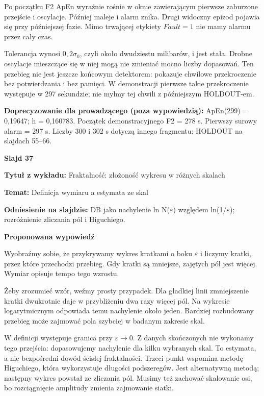 \documentclass[a4paper,11pt]{article}
\newcommand{\NumerSlajdu}{1}
\newcommand{\Komentarz}[3]{%
  \gdef\NumerSlajdu{#1}%
  {\Large\bfseries Slajd #1\par}\smallskip
  \textbf{Tytuł z wykładu:} #2\par
  \textbf{Temat:} #3\par\medskip
}
\begin{document}
Po początku F2 ApEn wyraźnie rośnie w oknie zawierającym pierwsze zaburzone przejście i oscylacje. Później maleje i alarm znika. Drugi widoczny epizod pojawia się przy późniejszej fazie. Mimo trwającej etykiety $Fault=1$ nie mamy alarmu przez cały czas.

Tolerancja wynosi $0{,}2\sigma_0$, czyli około dwudziestu milibarów, i jest stała. Drobne oscylacje mieszczące się w niej mogą nie zmieniać mocno liczby dopasowań. Ten przebieg nie jest jeszcze końcowym detektorem: pokazuje chwilowe przekroczenie bez potwierdzania i bez pamięci. W demonstracji pierwsze takie przekroczenie występuje w 297 sekundzie; nie mylmy tej chwili z późniejszym HOLDOUT-em.

{\small\color{black!65}\textbf{Doprecyzowanie dla prowadzącego (poza wypowiedzią):} ApEn(299) = 0,19647; h = 0,160783. Początek demonstracyjnego F2 = 278 s. Pierwszy surowy alarm = 297 s. Liczby 300 i 302 s dotyczą innego fragmentu: HOLDOUT na slajdach 55–66.\par}
\clearpage

\Komentarz{37}{Fraktalność: złożoność wykresu w różnych skalach}{Definicja wymiaru a estymata ze skal}
{\small\color{black!65}\textbf{Odniesienie na slajdzie:} DB jako nachylenie ln N(\ensuremath{\varepsilon}) względem ln(1/\ensuremath{\varepsilon}); rozróżnienie zliczania pól i Higuchiego.\par}
\medskip
\textbf{Proponowana wypowiedź}\par
Wyobraźmy sobie, że przykrywamy wykres kratkami o boku $\varepsilon$ i liczymy kratki, przez które przechodzi przebieg. Gdy kratki są mniejsze, zajętych pól jest więcej. Wymiar opisuje tempo tego wzrostu.

Żeby zrozumieć wzór, weźmy prosty przypadek. Dla gładkiej linii zmniejszenie kratki dwukrotnie daje w przybliżeniu dwa razy więcej pól. Na wykresie logarytmicznym odpowiada temu nachylenie około jeden. Bardziej rozbudowany przebieg może zajmować pola szybciej w badanym zakresie skal.

W definicji występuje granica przy $\varepsilon\to0$. Z danych skończonych nie wykonamy tego przejścia: dopasowujemy nachylenie dla kilku wybranych skal. To estymata, a nie bezpośredni dowód ścisłej fraktalności. Trzeci punkt wspomina metodę Higuchiego, która wykorzystuje długości podszeregów. Jest alternatywną metodą; następny wykres powstał ze zliczania pól. Musimy też zachować skalowanie osi, bo rozciągnięcie amplitudy zmienia zajmowanie siatki.
\clearpage
\end{document}
